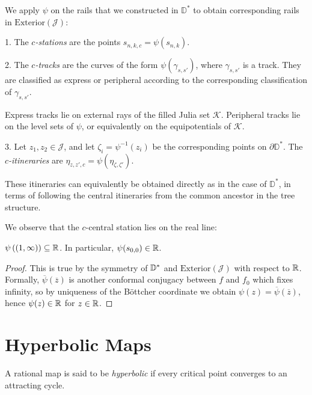 We apply $\psi$ on the rails that we constructed in $\mathbb D^*$ to obtain corresponding rails in $\mathrm{Exterior}(\mathcal{J})$:
\begin{definition}

1. The 	\emph{$c$-stations} are the points  $s_{n,k,c}=\psi(s_{n,k})$.

2. The \emph{$c$-tracks} are the curves of the form $\psi \left(\gamma_{s,s'}\right)$, where $\gamma_{s,s'}$ is a track. They are classified as express or peripheral according to the corresponding classification of $\gamma_{s,s'}$. 

Express tracks lie on external rays of the filled Julia set $\mathcal K$.
Peripheral tracks lie on the level sets of $\psi$, or equivalently on the equipotentials of $\mathcal K$.

3. Let $z_1,z_2\in \mathcal J$, and let $\zeta_i=\psi^{-1}(z_i)$ be the corresponding points on $\partial \mathbb D^*$. 
The \emph{$c$-itineraries} are $\eta_{z,z',c}=\psi(\eta_{\zeta,\zeta'})$.

These itineraries can equivalently be obtained directly as in the case of $\mathbb D^*$, in terms of following the central itineraries from the common ancestor in the tree structure.
\end{definition}

We observe that the $c$-central station lies on the real line:

\begin{lemma}$\psi\left((1,\infty)\right)\subseteq\mathbb{R}$. In particular,
	$\psi(s_{0,0})\in\mathbb{R}$.
\end{lemma}
\begin{proof}
	This is true by the symmetry of $\mathbb{D}^{*}$ and $\mathrm{Exterior}(\mathcal{J})$
	with respect to $\mathbb{R}$. Formally, $\overline{\psi}(\overline{z})$
	is another conformal conjugacy between $f$ and $f_0$ which fixes infinity, so by uniqueness of the Böttcher coordinate we obtain $\psi(z)=\overline{\psi}(\overline{z})$,
	hence $\psi(z)\in\mathbb{R}$ for $z\in\mathbb{R}$.
\end{proof}

\section{Hyperbolic Maps}

A rational map is said to be \emph{hyperbolic} if every critical point converges to an attracting cycle.

